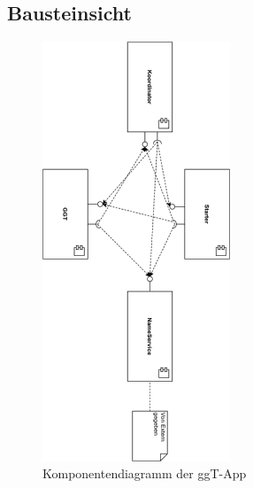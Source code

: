 \documentclass{article}
\begin{document}
\subsection{Bausteinsicht}
\begin{figure}[H]
    \centering
    \includegraphics[width=0.5\textwidth]{component-diagram.png}
    \caption[seq-dia]{Komponentendiagramm der ggT-App}
    \label{fig:component-diagram}
\end{figure}
\end{document}
